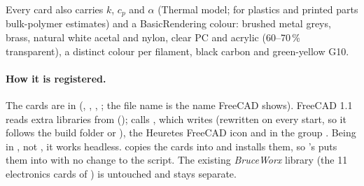 Every card also carries $k$, $c_p$ and $\alpha$ (Thermal model; for plastics and printed parts bulk-polymer estimates)
and a BasicRendering colour: brushed metal greys, brass, natural white acetal and nylon, clear PC and acrylic (60--70\,\%
transparent), a distinct colour per filament, black carbon and green-yellow G10.

\paragraph{How it is registered.} The cards are in 
(, , , ; the file name is the name FreeCAD shows). FreeCAD
1.1 reads extra libraries from 
();  calls , which writes
 (rewritten on every start, so it follows the build folder or ), the Heuretes FreeCAD icon
and  in the group . Being in , not , it works
headless.  copies the cards into  and installs
them, so 's  puts them into  with no change to the
script. The existing \emph{BruceWorx} library (the 11 electronics cards of ) is untouched and stays
separate.

